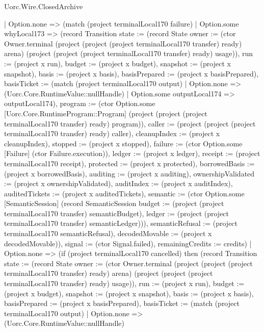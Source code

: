 \begin{lexlean}{Uorc.Wire.ClosedArchive}
\begin{semanticmodule}
{        | Option.none => (match (project terminalLocal170 failure)
          | Option.some whyLocal173 => (record Transition {state := (record State {owner := (ctor Owner.terminal (project (project (project terminalLocal170 transfer) ready) arena) (project (project (project terminalLocal170 transfer) ready) usage)), run := (project x run), budget := (project x budget), snapshot := (project x snapshot), basis := (project x basis), basisPrepared := (project x basisPrepared), basisTicket := (match (project terminalLocal170 output)
            | Option.none => (Uorc.Core.RuntimeValue::nullHandle)
            | Option.some outputLocal174 => outputLocal174), program := (ctor Option.some [Uorc.Core.RuntimeProgram::Program] (project (project (project terminalLocal170 transfer) ready) program)), caller := (project (project (project terminalLocal170 transfer) ready) caller), cleanupIndex := (project x cleanupIndex), stopped := (project x stopped), failure := (ctor Option.some [Failure] (ctor Failure.execution)), ledger := (project x ledger), receipt := (project terminalLocal170 receipt), protected := (project x protected), borrowedBasis := (project x borrowedBasis), auditing := (project x auditing), ownershipValidated := (project x ownershipValidated), auditIndex := (project x auditIndex), auditedTickets := (project x auditedTickets), semantic := (ctor Option.some [SemanticSession] (record SemanticSession {budget := (project (project terminalLocal170 transfer) semanticBudget), ledger := (project (project terminalLocal170 transfer) semanticLedger)})), semanticRefusal := (project terminalLocal170 semanticRefusal), decodedMovable := (project x decodedMovable)}), signal := (ctor Signal.failed), remainingCredits := credits})
          | Option.none => (if (project terminalLocal170 cancelled) then (record Transition {state := (record State {owner := (ctor Owner.terminal (project (project (project terminalLocal170 transfer) ready) arena) (project (project (project terminalLocal170 transfer) ready) usage)), run := (project x run), budget := (project x budget), snapshot := (project x snapshot), basis := (project x basis), basisPrepared := (project x basisPrepared), basisTicket := (match (project terminalLocal170 output)
            | Option.none => (Uorc.Core.RuntimeValue::nullHandle)
}}}
\end{semanticmodule}
\end{lexlean}
